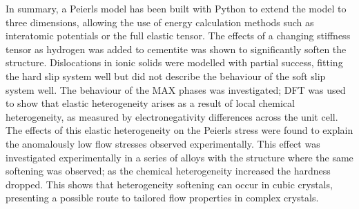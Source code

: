In summary, a Peierls model has been built with Python to extend the model to three dimensions, allowing the use of energy calculation methods such as interatomic potentials or the full elastic tensor. The effects of a changing stiffness tensor as hydrogen was added to cementite was shown to significantly soften the structure. Dislocations in ionic solids were modelled with partial success, fitting the hard slip system well but did not describe the behaviour of the soft slip system well. The behaviour of the MAX phases was investigated; DFT was used to show that elastic heterogeneity arises as a result of local chemical heterogeneity, as measured by electronegativity differences across the unit cell. The effects of this elastic heterogeneity on the Peierls stress were found to explain the anomalously low flow stresses observed experimentally. This effect was investigated experimentally in a series of alloys with the  structure where the same softening was observed; as the chemical heterogeneity increased the hardness dropped. This shows that heterogeneity softening can occur in cubic crystals, presenting a possible route to tailored flow properties in complex crystals.


































































